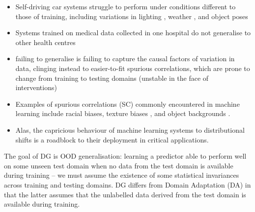 \itemi\begin{itemize}
  \item Self-driving car systems struggle to perform under conditions different to those of 
    training, including variations in lighting \citep{dai2018dark}, weather \citep{volk2019towards}, 
    and object poses \citep{alcorn2019strike}
  \item Systems trained on medical data collected in one hospital do not generalise to other health
    centres \citep{castro2020causality, albadawy2018deep}
  \item failing to generalise is failing to capture the causal factors of variation in data, 
    clinging instead to easier-to-fit spurious correlations, which are prone to change from 
    training to testing domains (unstable in the face of interventions)
  \item  Examples of spurious correlations (SC) commonly encountered in machine learning include 
    racial biases, texture biases \citep{geirhos2018imagenet}, and object backgrounds
    \citep{beery2018recognition} .
  \item Alas, the capricious behaviour of machine learning systems to distributional shifts is a 
    roadblock to their deployment in critical applications.
\end{itemize}

The goal of DG is OOD generalisation: learning a predictor able to perform well on some unseen test
domain when no data from the test domain is available during training -- we must assume the 
existence of some statistical invariances across training and testing domains.
DG differs from Domain Adaptation (DA) in that the latter assumes that the unlabelled data derived 
from the test domain is available during training.

